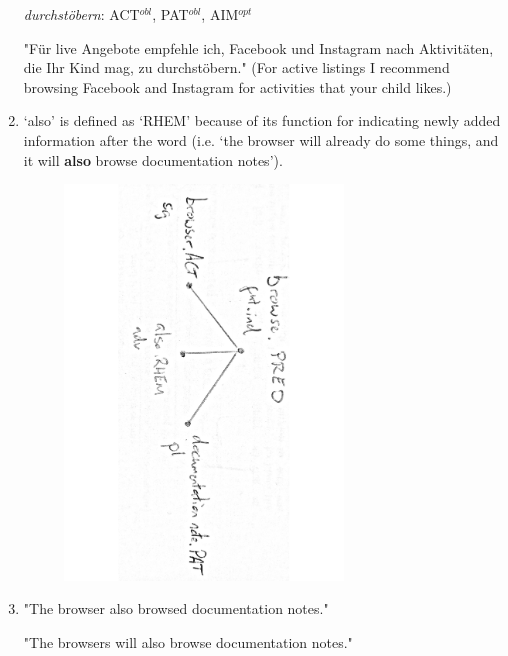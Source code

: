 \documentclass[a4paper]{article}
\begin{document}
\begin{enumerate}
\textit{durchstöbern}: ACT$^{obl}$, PAT$^{obl}$, AIM$^{opt}$


"Für live Angebote empfehle ich, Facebook und Instagram nach Aktivitäten,
die Ihr Kind mag, zu durchstöbern." (For active listings I recommend browsing 
Facebook and Instagram for activities that your child likes.)

\item %

`also' is defined as `RHEM' because of its function for indicating newly added
information after the word (i.e. `the browser will already do some things, and
it will \textbf{also} browse documentation notes').


	\begin{figure}[H]
		\centering
		\includegraphics[width=0.7\textwidth, angle=90]{browse_fgd.pdf}
		\label{fig:fgd}
	\end{figure}

\item %

	"The browser also browsed documentation notes."

	"The browsers will also browse documentation notes."


\end{enumerate}
\end{document}
